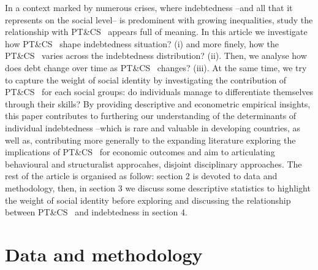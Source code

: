 \documentclass[a4paper, 11pt, onecolumn]{article}
\newcommand{\PTCS}{PT\&CS}
\begin{document}


In a context marked by numerous crises, where indebtedness --and all that it represents on the social level-- is predominent with growing inequalities, study the relationship with \PTCS~ appears full of meaning.
In this article we investigate how \PTCS~ shape indebtedness situation? (i) and more finely, how the \PTCS~ varies across the indebtedness distribution? (ii).
Then, we analyse how does debt change over time as \PTCS~ changes? (iii).%
At the same time, we try to capture the weight of social identity by investigating the contribution of \PTCS~ for each social groups: do individuals manage to differentiate themselves through their skills?
By providing descriptive and econometric empirical insights, this paper contributes to furthering our understanding of the determinants of individual indebtedness --which is rare and valuable in developing countries, as well as, contributing more generally to the expanding literature exploring the implications of \PTCS~ for economic outcomes and aim to articulating behavioural and structuralist approcahes, disjoint disciplinary approaches.
The rest of the article is organised as follow: section 2 is devoted to data and methodology, then, in section 3 we discuss some descriptive statistics to highlight the weight of social identity before exploring and discussing the relationship between \PTCS~ and indebtedness in section 4.



\section{Data and methodology}
\end{document}
